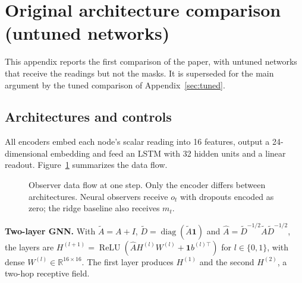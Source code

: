 \documentclass[conference]{IEEEtran}
\begin{document}
\section{Original architecture comparison (untuned networks)}
This appendix reports the first comparison of the paper, with untuned networks that receive the readings but not the masks. It is superseded for the main argument by the tuned comparison of Appendix~\ref{sec:tuned}.

\subsection{Architectures and controls}
\label{sec:arch}

All encoders embed each node's scalar reading into 16 features, output a 24-dimensional embedding and feed an LSTM with 32 hidden units and a linear readout. Figure~\ref{fig:pipeline} summarizes the data flow.

\begin{figure}[t]
\centering
{}
\caption{Observer data flow at one step. Only the encoder differs between architectures. Neural observers receive $o_t$ with dropouts encoded as zero; the ridge baseline also receives $m_t$.}
\label{fig:pipeline}
\end{figure}

\textbf{Two-layer GNN.} With $\tilde A=A+I$, $\tilde D=\operatorname{diag}(\tilde A\mathbf 1)$ and $\hat A=\tilde D^{-1/2}\tilde A\tilde D^{-1/2}$, the layers are $H^{(l+1)}=\operatorname{ReLU}(\hat AH^{(l)}W^{(l)}+\mathbf 1 b^{(l)\top})$ for $l\in\{0,1\}$, with dense $W^{(l)}\in\mathbb{R}^{16\times 16}$. The first layer produces $H^{(1)}$ and the second $H^{(2)}$, a two-hop receptive field.
\end{document}
